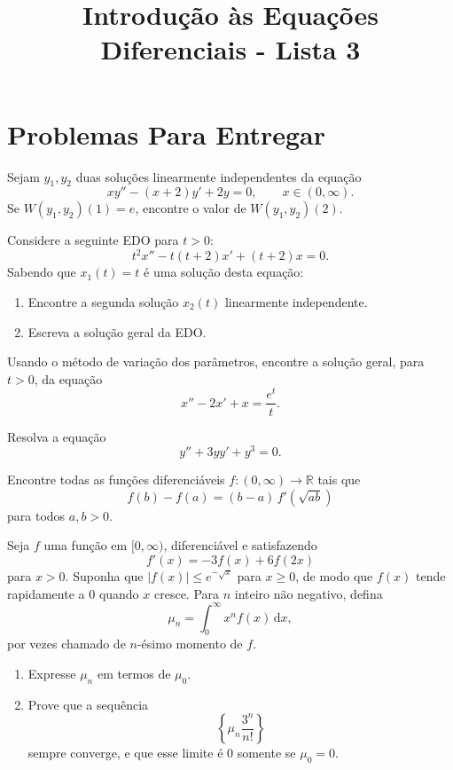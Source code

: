 \documentclass[10pt,a4paper]{amsart}
\title{Introdução às Equações Diferenciais - Lista 3}
\newcommand{\R}{\mathbb{R}}
\renewcommand{\d}{\mathrm{d}}
\begin{document}
\maketitle

\section*{Problemas Para Entregar}


\vspace{4mm}

 Sejam $y_1, y_2$ duas soluções linearmente independentes da equação
\[
    xy'' - (x + 2)y' + 2y = 0, \qquad x \in (0,\infty).
\]
Se $W(y_1, y_2)(1) = e$, encontre o valor de $W(y_1, y_2)(2)$.

\vspace{5mm}

 Considere a seguinte EDO para $t > 0$:
\[
    t^2 x'' - t(t + 2)x' + (t + 2)x = 0.
\]
Sabendo que $x_1(t) = t$ é uma solução desta equação:
\begin{enumerate}[label=(\alph*)]
    \item Encontre a segunda solução $x_2(t)$ linearmente independente.
    \item Escreva a solução geral da EDO.
\end{enumerate}

\vspace{5mm}

 Usando o método de variação dos parâmetros, encontre a solução geral, para $t > 0$, da equação
\[
    x'' - 2x' + x = \frac{e^{t}}{t}.
\]

\vspace{5mm}

 Resolva a equação
\[
    y'' + 3yy' + y^3 = 0.
\]

\vspace{5mm}

 Encontre todas as funções diferenciáveis $f : (0,\infty) \to \R$ tais que
\[
    f(b) - f(a) = (b - a)\,f'\!\left(\sqrt{ab}\right)
\]
para todos $a, b > 0$.

\vspace{5mm}

 Seja $f$ uma função em $[0,\infty)$, diferenciável e satisfazendo
\[
    f'(x) = -3f(x) + 6f(2x)
\]
para $x > 0$. Suponha que $|f(x)| \leq e^{-\sqrt{x}}$ para $x \geq 0$, de modo que $f(x)$ tende rapidamente a $0$ quando $x$ cresce. Para $n$ inteiro não negativo, defina
\[
    \mu_n = \int_0^\infty x^n f(x) \,\d x,
\]
por vezes chamado de $n$-ésimo momento de $f$.
\begin{enumerate}[label=(\alph*)]
    \item Expresse $\mu_n$ em termos de $\mu_0$.
    \item Prove que a sequência
    \[
        \left\{ \mu_n \frac{3^n}{n!} \right\}
    \]
    sempre converge, e que esse limite é $0$ somente se $\mu_0 = 0$.
\end{enumerate}
\end{document}
